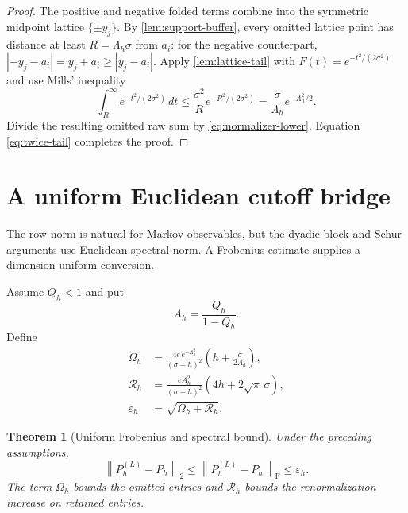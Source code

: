 \documentclass[11pt]{article}
\newtheorem{theorem}{Theorem}[section]
\theoremstyle{definition}
\theoremstyle{remark}
\newcommand{\norm}[1]{\left\lVert #1\right\rVert}
\begin{document}
\begin{proof}
The positive and negative folded terms combine into the symmetric midpoint
lattice $\{\pm y_j\}$.  By \cref{lem:support-buffer}, every omitted lattice
point has distance at least $R=\Lambda_h\sigma$ from $a_i$: for the negative
counterpart, $|-y_j-a_i|=y_j+a_i\ge|y_j-a_i|$.  Apply
\cref{lem:lattice-tail} with $F(t)=e^{-t^2/(2\sigma^2)}$ and use Mills'
inequality
\citep{Gordon1941}
\[
\int_R^\infty e^{-t^2/(2\sigma^2)}\,dt
\le\frac{\sigma^2}{R}e^{-R^2/(2\sigma^2)}
=\frac\sigma{\Lambda_h}e^{-\Lambda_h^2/2}.
\]
Divide the resulting omitted raw sum by
\eqref{eq:normalizer-lower}.  Equation \eqref{eq:twice-tail} completes the
proof.
\end{proof}

\section{A uniform Euclidean cutoff bridge}
\label{sec:euclidean}

The row norm is natural for Markov observables, but the dyadic block and Schur
arguments use Euclidean spectral norm.  A Frobenius estimate supplies a
dimension-uniform conversion.

Assume $Q_h<1$ and put
\begin{equation}
A_h=\frac{Q_h}{1-Q_h}.
\label{eq:A-bound}
\end{equation}
Define
\begin{align}
\Omega_h
&=
\frac{4e\,e^{-\Lambda_h^2}}
     {(\sigma-h)^2}
\left(h+\frac{\sigma}{2\Lambda_h}\right),
\label{eq:Omega-bound}\\
\mathcal R_h
&=
\frac{eA_h^2}{(\sigma-h)^2}
\left(4h+2\sqrt\pi\,\sigma\right),
\label{eq:R-bound}\\
\varepsilon_h
&=\sqrt{\Omega_h+\mathcal R_h}.
\label{eq:epsilon-bound}
\end{align}

\begin{theorem}[Uniform Frobenius and spectral bound]
\label{thm:euclidean}
Under the preceding assumptions,
\begin{equation}
\norm{P_h^{(L)}-P_h}_2
\le\norm{P_h^{(L)}-P_h}_{\mathrm F}
\le\varepsilon_h.
\label{eq:euclidean-result}
\end{equation}
The term $\Omega_h$ bounds the omitted entries and $\mathcal R_h$ bounds the
renormalization increase on retained entries.
\end{theorem}
\end{document}
